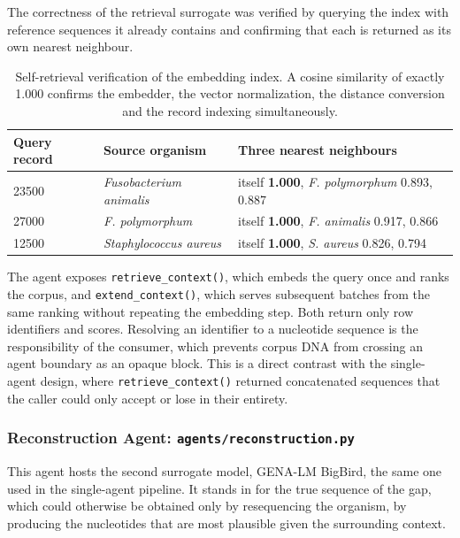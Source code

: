 The correctness of the retrieval surrogate was verified by querying the index with reference
sequences it already contains and confirming that each is returned as its own nearest
neighbour.

\begin{table}[H]
\centering
\begin{tabular}{lll}
\toprule
\textbf{Query record} & \textbf{Source organism} & \textbf{Three nearest neighbours} \\
\midrule
23500 & \textit{Fusobacterium animalis} & itself \textbf{1.000}, \textit{F. polymorphum} 0.893, 0.887 \\
27000 & \textit{F. polymorphum}         & itself \textbf{1.000}, \textit{F. animalis} 0.917, 0.866 \\
12500 & \textit{Staphylococcus aureus}  & itself \textbf{1.000}, \textit{S. aureus} 0.826, 0.794 \\
\bottomrule
\end{tabular}
\caption{Self-retrieval verification of the embedding index. A cosine similarity of exactly
1.000 confirms the embedder, the vector normalization, the distance conversion and the
record indexing simultaneously.}
\label{tab:self-retrieval}
\end{table}

The agent exposes \texttt{retrieve\_context()}, which embeds the query once and ranks the
corpus, and \texttt{extend\_context()}, which serves subsequent batches from the same ranking
without repeating the embedding step. Both return only row identifiers and scores. Resolving
an identifier to a nucleotide sequence is the responsibility of the consumer, which prevents
corpus DNA from crossing an agent boundary as an opaque block. This is a direct contrast with
the single-agent design, where \texttt{retrieve\_context()} returned concatenated sequences
that the caller could only accept or lose in their entirety.

\subsubsection{Reconstruction Agent: \texttt{agents/reconstruction.py}}

This agent hosts the second surrogate model, GENA-LM BigBird, the same one used in
the single-agent pipeline. It stands in for the true sequence of the gap, which could
otherwise be obtained only by resequencing the organism, by producing the nucleotides that
are most plausible given the surrounding context.

